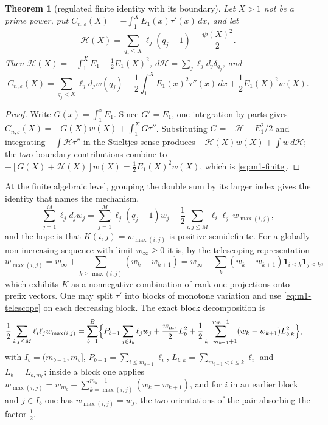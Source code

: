 \documentclass[11pt]{amsart}
\newtheorem{theorem}{Theorem}[section]
\theoremstyle{definition}
\theoremstyle{remark}
\theoremstyle{definition}
\newcommand{\eps}{\varepsilon}
\begin{document}
\begin{theorem}[regulated finite identity with its boundary]\label{thm:m1-finite}
Let $X>1$ not be a prime power, put $C_{n,\eps}(X)=-\int_1^XE_1(x)\tau'(x)\,dx$, and let
\[
   \mathcal H(X)=\sum_{q_j\le X}\ell_j(q_j-1)-\frac{\psi(X)^2}{2}.
\]
Then $\mathcal H(X)=-\int_1^XE_1-\tfrac12E_1(X)^2$, $d\mathcal H=\sum_j\ell_jd_j\delta_{q_j}$, and
\begin{equation}\label{eq:m1-finite}
   C_{n,\eps}(X)=\sum_{q_j<X}\ell_jd_jw(q_j)
   -\frac12\int_1^XE_1(x)^2\tau''(x)\,dx
   +\frac12E_1(X)^2w(X).
\end{equation}
\end{theorem}

\begin{proof}
Write $G(x)=\int_1^xE_1$. Since $G'=E_1$, one integration by parts gives
$C_{n,\eps}(X)=-G(X)w(X)+\int_1^XG\tau''$. Substituting $G=-\mathcal H-E_1^2/2$ and integrating
$-\int\mathcal H\tau''$ in the Stieltjes sense produces
$-\mathcal H(X)w(X)+\int w\,d\mathcal H$; the two boundary contributions combine to
$-[G(X)+\mathcal H(X)]w(X)=\tfrac12E_1(X)^2w(X)$, which is \eqref{eq:m1-finite}.
\end{proof}

At the finite algebraic level, grouping the double sum by its larger index gives the identity
that names the mechanism,
\begin{equation}\label{eq:m1-max}
   \sum_{j=1}^M\ell_jd_jw_j
   =\sum_{j=1}^M\ell_j(q_j-1)w_j
   -\frac12\sum_{i,j\le M}\ell_i\ell_j\,w_{\max(i,j)} ,
\end{equation}
and the hope is that $K(i,j)=w_{\max(i,j)}$ is positive semidefinite. For a globally
non-increasing sequence with limit $w_\infty\ge0$ it is, by the telescoping representation
\begin{equation}\label{eq:m1-telescope}
   w_{\max(i,j)}=w_\infty+\sum_{k\ge\max(i,j)}(w_k-w_{k+1})
   =w_\infty+\sum_k(w_k-w_{k+1})\mathbf1_{i\le k}\mathbf1_{j\le k},
\end{equation}
which exhibits $K$ as a nonnegative combination of rank-one projections onto prefix vectors. One
may split $\tau'$ into blocks of monotone variation and use \eqref{eq:m1-telescope}
on each decreasing block. The exact block decomposition is
\begin{equation}\label{eq:m1-blocks}
\begin{split}
   \frac12\sum_{i,j\le M}\ell_i\ell_jw_{\max(i,j)}
   =\sum_{b=1}^B\Bigl\{&P_{b-1}\sum_{j\in I_b}\ell_jw_j
   +\frac{w_{m_b}}{2}L_b^2
   +\frac12\sum_{k=m_{b-1}+1}^{m_b-1}(w_k-w_{k+1})L_{b,k}^2\Bigr\},
\end{split}
\end{equation}
with $I_b=(m_{b-1},m_b]$, $P_{b-1}=\sum_{i\le m_{b-1}}\ell_i$,
$L_{b,k}=\sum_{m_{b-1}<i\le k}\ell_i$ and $L_b=L_{b,m_b}$; inside a block one applies
$w_{\max(i,j)}=w_{m_b}+\sum_{k=\max(i,j)}^{m_b-1}(w_k-w_{k+1})$, and for $i$ in an earlier block
and $j\in I_b$ one has $w_{\max(i,j)}=w_j$, the two orientations of the pair absorbing the factor
$\tfrac12$.
\end{document}
